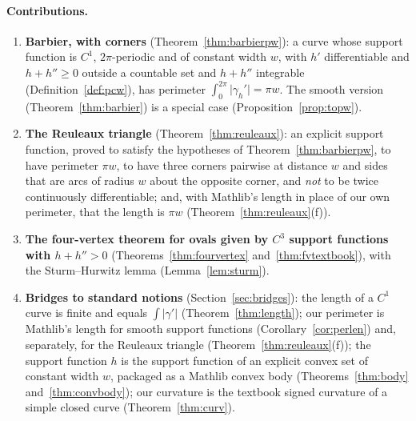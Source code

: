 \documentclass[11pt]{article}
\theoremstyle{definition}
\theoremstyle{remark}
\begin{document}
\paragraph{Contributions.}
\begin{enumerate}
\item \textbf{Barbier, with corners} (Theorem~\ref{thm:barbierpw}): a curve whose support function is
$C^1$, $2\pi$-periodic and of constant width $w$, with $h'$ differentiable and $h+h''\ge 0$ outside a
countable set and $h+h''$ integrable (Definition~\ref{def:pcw}), has
perimeter $\int_0^{2\pi}\lvert\gamma_h'\rvert = \pi w$. The smooth version (Theorem~\ref{thm:barbier}) is a special case
(Proposition~\ref{prop:topw}).
\item \textbf{The Reuleaux triangle} (Theorem~\ref{thm:reuleaux}): an explicit support function,
proved to satisfy the hypotheses of Theorem~\ref{thm:barbierpw}, to have perimeter $\pi w$, to have
three corners pairwise at distance $w$ and sides that are arcs of radius $w$ about the opposite
corner, and \emph{not} to be twice continuously differentiable; and, with Mathlib's length in
place of our own perimeter, that the length is $\pi w$ (Theorem~\ref{thm:reuleaux}(f)).
\item \textbf{The four-vertex theorem for ovals given by $C^3$ support functions with $h+h''>0$}
(Theorems~\ref{thm:fourvertex} and~\ref{thm:fvtextbook}), with the Sturm--Hurwitz lemma
(Lemma~\ref{lem:sturm}).
\item \textbf{Bridges to standard notions} (Section~\ref{sec:bridges}): the length of a $C^1$ curve
is finite and equals $\int\lvert\gamma'\rvert$ (Theorem~\ref{thm:length}); our perimeter is
Mathlib's length for smooth support functions (Corollary~\ref{cor:perlen}) and, separately, for the
Reuleaux triangle (Theorem~\ref{thm:reuleaux}(f)); the support function $h$ is the support function of
an explicit convex set of constant width $w$, packaged as a Mathlib convex body
(Theorems~\ref{thm:body} and~\ref{thm:convbody}); our curvature is the
textbook signed curvature of a simple closed curve (Theorem~\ref{thm:curv}).
\end{enumerate}
\end{document}
